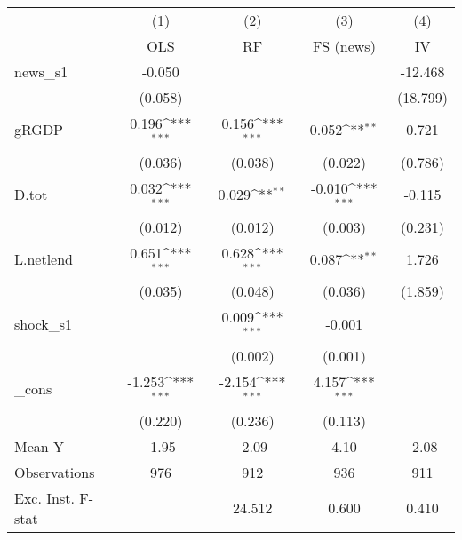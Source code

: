 {
\def\sym#1{\ifmmode^{#1}\else\(^{#1}\)\fi}
\begin{tabular}{l*{4}{c}}
\toprule
            &\multicolumn{1}{c}{(1)}&\multicolumn{1}{c}{(2)}&\multicolumn{1}{c}{(3)}&\multicolumn{1}{c}{(4)}\\
            &\multicolumn{1}{c}{OLS}&\multicolumn{1}{c}{RF}&\multicolumn{1}{c}{FS (news)}&\multicolumn{1}{c}{IV}\\
\midrule
news\_s1     &      -0.050         &                     &                     &     -12.468         \\
            &     (0.058)         &                     &                     &    (18.799)         \\
\addlinespace
gRGDP       &       0.196\sym{***}&       0.156\sym{***}&       0.052\sym{**} &       0.721         \\
            &     (0.036)         &     (0.038)         &     (0.022)         &     (0.786)         \\
\addlinespace
D.tot       &       0.032\sym{***}&       0.029\sym{**} &      -0.010\sym{***}&      -0.115         \\
            &     (0.012)         &     (0.012)         &     (0.003)         &     (0.231)         \\
\addlinespace
L.netlend   &       0.651\sym{***}&       0.628\sym{***}&       0.087\sym{**} &       1.726         \\
            &     (0.035)         &     (0.048)         &     (0.036)         &     (1.859)         \\
\addlinespace
shock\_s1    &                     &       0.009\sym{***}&      -0.001         &                     \\
            &                     &     (0.002)         &     (0.001)         &                     \\
\addlinespace
\_cons      &      -1.253\sym{***}&      -2.154\sym{***}&       4.157\sym{***}&                     \\
            &     (0.220)         &     (0.236)         &     (0.113)         &                     \\
\midrule
Mean Y      &       -1.95         &       -2.09         &        4.10         &       -2.08         \\
Observations&         976         &         912         &         936         &         911         \\
Exc. Inst. F-stat&                     &      24.512         &       0.600         &       0.410         \\
\bottomrule
\end{tabular}
}
